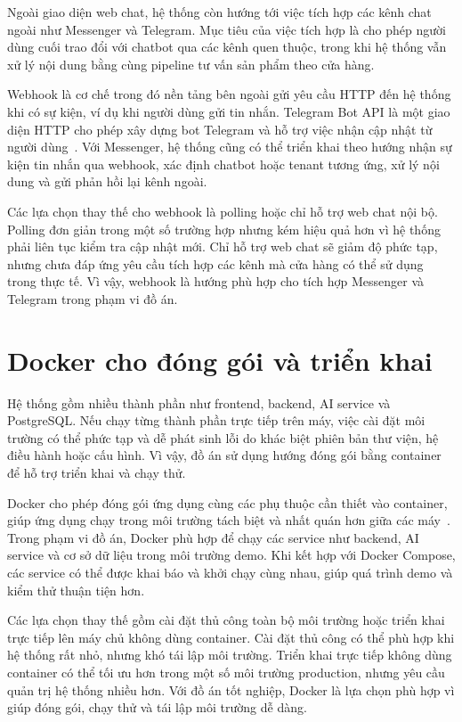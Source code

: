 \documentclass[../DoAn.tex]{subfiles}
\begin{document}
Ngoài giao diện web chat, hệ thống còn hướng tới việc tích hợp các kênh chat ngoài như Messenger và Telegram. Mục tiêu của việc tích hợp là cho phép người dùng cuối trao đổi với chatbot qua các kênh quen thuộc, trong khi hệ thống vẫn xử lý nội dung bằng cùng pipeline tư vấn sản phẩm theo cửa hàng.

Webhook là cơ chế trong đó nền tảng bên ngoài gửi yêu cầu HTTP đến hệ thống khi có sự kiện, ví dụ khi người dùng gửi tin nhắn. Telegram Bot API là một giao diện HTTP cho phép xây dựng bot Telegram và hỗ trợ việc nhận cập nhật từ người dùng~\cite{telegram_bot_api}. Với Messenger, hệ thống cũng có thể triển khai theo hướng nhận sự kiện tin nhắn qua webhook, xác định chatbot hoặc tenant tương ứng, xử lý nội dung và gửi phản hồi lại kênh ngoài.

Các lựa chọn thay thế cho webhook là polling hoặc chỉ hỗ trợ web chat nội bộ. Polling đơn giản trong một số trường hợp nhưng kém hiệu quả hơn vì hệ thống phải liên tục kiểm tra cập nhật mới. Chỉ hỗ trợ web chat sẽ giảm độ phức tạp, nhưng chưa đáp ứng yêu cầu tích hợp các kênh mà cửa hàng có thể sử dụng trong thực tế. Vì vậy, webhook là hướng phù hợp cho tích hợp Messenger và Telegram trong phạm vi đồ án.

\section{Docker cho đóng gói và triển khai}
\label{section:3.12}

Hệ thống gồm nhiều thành phần như frontend, backend, AI service và PostgreSQL. Nếu chạy từng thành phần trực tiếp trên máy, việc cài đặt môi trường có thể phức tạp và dễ phát sinh lỗi do khác biệt phiên bản thư viện, hệ điều hành hoặc cấu hình. Vì vậy, đồ án sử dụng hướng đóng gói bằng container để hỗ trợ triển khai và chạy thử.

Docker cho phép đóng gói ứng dụng cùng các phụ thuộc cần thiết vào container, giúp ứng dụng chạy trong môi trường tách biệt và nhất quán hơn giữa các máy~\cite{docker_docs}. Trong phạm vi đồ án, Docker phù hợp để chạy các service như backend, AI service và cơ sở dữ liệu trong môi trường demo. Khi kết hợp với Docker Compose, các service có thể được khai báo và khởi chạy cùng nhau, giúp quá trình demo và kiểm thử thuận tiện hơn.

Các lựa chọn thay thế gồm cài đặt thủ công toàn bộ môi trường hoặc triển khai trực tiếp lên máy chủ không dùng container. Cài đặt thủ công có thể phù hợp khi hệ thống rất nhỏ, nhưng khó tái lập môi trường. Triển khai trực tiếp không dùng container có thể tối ưu hơn trong một số môi trường production, nhưng yêu cầu quản trị hệ thống nhiều hơn. Với đồ án tốt nghiệp, Docker là lựa chọn phù hợp vì giúp đóng gói, chạy thử và tái lập môi trường dễ dàng.
\end{document}
